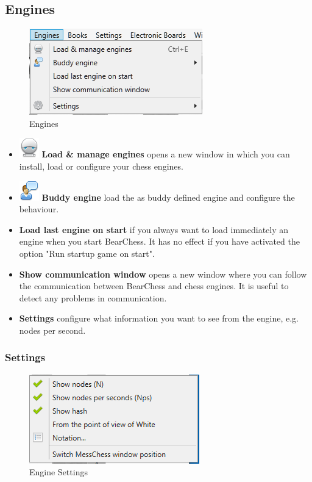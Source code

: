 \documentclass[11pt,a4paper]{article}
\begin{document}
\subsection{Engines}
\begin{figure}[H]
	\centering
	\includegraphics[scale=1.0]{Engines.png}
	\caption{Engines}
	\label{fig:Engines}
\end{figure}
\begin{itemize}
	\item  \includegraphics[scale=0.5]{robot.png} \textbf{Load \& manage engines} opens a new window in which you can install, load or configure your chess engines.
	\item  \includegraphics[scale=0.5]{user_comment.png} \textbf{Buddy engine} load the as buddy defined engine and configure the behaviour.
	\item \textbf{Load last engine on start} if you always want to load immediately an engine when you start BearChess. It has no effect if you have activated the option "Run startup game on start".
	\item \textbf{Show communication window} opens a new window where you can follow the communication between BearChess and chess engines. It is useful to detect any problems in communication.
	\item \textbf{Settings} configure what information you want to see from the engine, e.g. nodes per second.	
\end{itemize}

\subsubsection{Settings}
\begin{figure}[H]
	\centering
	\includegraphics[scale=1.0]{engineSettings.png}
	\caption{Engine Settings}
	\label{fig:EngineSettings}
\end{figure}
\end{document}
